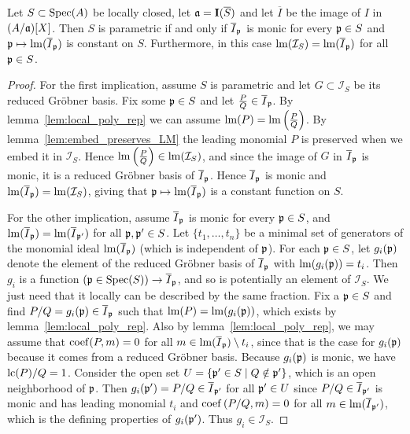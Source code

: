 \begin{theorem}\label{thm:para_iff_I_p_monic}
  Let $S \subset \operatorname{Spec}(A)$ be locally closed, let $\mathfrak{a} = \operatorname{\mathbf I}(\overline S)$ and let $\overline I$ be the image of $I$ in $(A/\mathfrak{a})[X]$. Then $S$ is parametric if and only if $\overline I_{\mathfrak p}$ is monic for every $\mathfrak p \in S$ and $\mathfrak p \mapsto \operatorname{lm}(\overline I_{\mathfrak p})$ is constant on $S$. Furthermore, in this case $\operatorname{lm}(\mathcal I_{S}) = \operatorname{lm}(\overline I_{\mathfrak p})$ for all $\mathfrak p \in S$.
\end{theorem}
\begin{proof}
  For the first implication, assume $S$ is parametric and let $G \subset \mathcal I_{S}$ be its reduced Gröbner basis. Fix some $\mathfrak p \in S$ and let $\frac P Q \in \overline I_{\mathfrak p}$. By lemma~\ref{lem:local_poly_rep} we can assume $\operatorname{lm}(P) = \operatorname{lm}\left(\frac P Q\right)$. By lemma~\ref{lem:embed_preserves_LM} the leading monomial $P$ is preserved when we embed it in $\mathcal I_{S}$. Hence $\operatorname{lm}\left(\frac P Q\right) \in \operatorname{lm}(\mathcal I_{S})$, and since the image of $G$ in $\overline I_{\mathfrak p}$ is monic, it is a reduced Gröbner basis of $\overline I_{\mathfrak p}$. Hence $\overline I_{\mathfrak p}$ is monic and $\operatorname{lm}(\overline I_{\mathfrak p}) = \operatorname{lm}(\mathcal I_{S})$, giving that $\mathfrak p \mapsto \operatorname{lm}(\overline I_{\mathfrak p})$ is a constant function on $S$.

  For the other implication, assume $\overline I_{\mathfrak p}$ is monic for every $\mathfrak p \in S$, and $\operatorname{lm}(\overline I_{\mathfrak p}) = \operatorname{lm}(\overline I_{\mathfrak p'})$ for all $\mathfrak p, \mathfrak p' \in S$. Let $\{t_{1}, \dots, t_{n}\}$ be a minimal set of generators of the monomial ideal $\operatorname{lm}(\overline I_{\mathfrak p})$ (which is independent of $\mathfrak p$). For each $\mathfrak p \in S$, let $g_{i}(\mathfrak p)$ denote the element of the reduced Gröbner basis of $\overline I_{\mathfrak p}$ with $\operatorname{lm}(g_{i}(\mathfrak p)) = t_{i}$. Then $g_{i}$ is a function $(\mathfrak p \in \operatorname{Spec}(S)) \to \overline I_{\mathfrak p}$, and so is potentially an element of $\mathcal I_{S}$. We just need that it locally can be described by the same fraction. Fix a $\mathfrak p \in S$ and find $P/Q = g_{i}(\mathfrak p) \in \overline I_{\mathfrak p}$ such that $\operatorname{lm}(P) = \operatorname{lm}(g_{i}(\mathfrak p))$, which exists by lemma~\ref{lem:local_poly_rep}. Also by lemma~\ref{lem:local_poly_rep}, we may assume that $\operatorname{coef}(P, m) = 0$ for all $m \in \operatorname{lm}(\overline I_{\mathfrak p}) \setminus {t_{i}}$, since that is the case for $g_{i}(\mathfrak p)$ because it comes from a reduced Gröbner basis. Because $g_{i}(\mathfrak p)$ is monic, we have $\operatorname{lc}(P)/Q = 1$. Consider the open set $U = \{\mathfrak p' \in S \mid Q \notin \mathfrak p'\}$, which is an open neighborhood of $\mathfrak p$. Then $g_{i}(\mathfrak p') = P/Q \in \overline I_{\mathfrak p'}$ for all $\mathfrak p' \in U$ since $P/Q \in \overline I_{\mathfrak p'}$ is monic and has leading monomial $t_{i}$ and $\operatorname{coef}\left(P/Q, m\right) = 0$ for all $m \in \operatorname{lm}(\overline I_{\mathfrak p'})$, which is the defining properties of $g_{i}(\mathfrak p')$. Thus $g_{i} \in \mathcal I_{S}$.


\end{proof}
